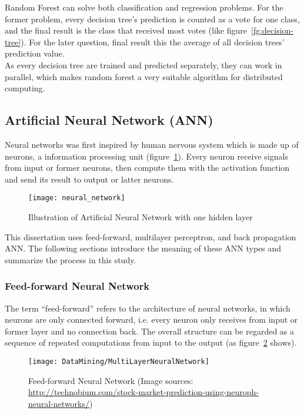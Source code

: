 Random Forest can solve both classification and regression problems. For the former problem, every decision tree's prediction is counted as a vote for one class, and the final result is the class that received most votes (like figure~\ref{fg:decision-tree}). For the later question, final result this the average of all decision trees' prediction value.\\


As every decision tree are trained and predicted separately, they can work in parallel, which makes random forest a very suitable algorithm for distributed computing.


\subsection{Artificial Neural Network (ANN)}
Neural networks was first inspired by human nervous system which is made up of neurons, a information processing unit (figure~\ref{fg:neural-nework}). Every neuron receive signals from input or former neurons, then compute them with the activation function and send its result to output or latter neurons\cite[p.~200]{4_kantardzic}.
\begin{figure}[ht]
	\centering
	\texttt{[image: neural\_network]}
	\caption{Illustration of Artificial Neural Network with one hidden layer}
	\label{fg:neural-nework}
\end{figure}

This dissertation uses feed-forward, multilayer perceptron, and back propagation ANN. The following sections introduce the meaning of these ANN types and summarize the process in this study.

\subsubsection{Feed-forward Neural Network}
The term ``feed-forward'' refers to the architecture of neural networks, in which neurons are only connected forward, i.e. every neuron only receives from input or former layer and no connection back\cite[p.~125]{heaton2008introduction}. The overall structure can be regarded as a sequence of repeated computations from input to the output (as figure~\ref{fg:FFNN} shows).
\begin{figure}[h]
	\centering
	\texttt{[image: DataMining/MultiLayerNeuralNetwork]}
	\caption{Feed-forward Neural Network (Image sources: \url{http://technobium.com/stock-market-prediction-using-neuroph-neural-networks/})}
	\label{fg:FFNN}
\end{figure}

